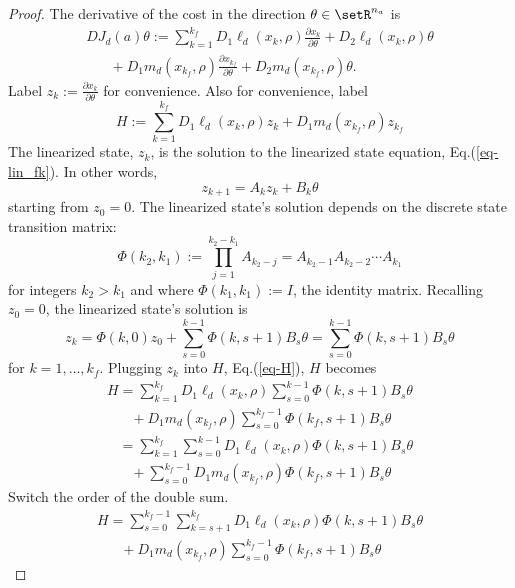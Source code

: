 \documentclass[letterpaper, 10pt, conference]{ieeeconf}
\begin{document}
\begin{proof}
The derivative of the cost in the direction $\theta\in\setR^{n_a}$ is
\begin{equation}
\begin{array}{l}
DJ_d(a)\theta:=\sum_{k=1}^{k_f}D_1\ell_d(x_k,\rho)\frac{\partial x_k}{\partial \theta} + D_2\ell_d(x_k,\rho)\theta \\\hspace{20pt}+ D_1m_d(x_{k_f},\rho)\frac{\partial x_{k_f}}{\partial \theta} + D_2m_d(x_{k_f},\rho)\theta.
\end{array}
\label{eq-DJ_dot_theta}
\end{equation}
Label $z_k:=\frac{\partial x_{k}}{\partial \theta}$ for convenience. Also for convenience, label 
\begin{equation}
H:=\sum_{k=1}^{k_f}D_1\ell_d(x_k,\rho) z_k + D_1m_d(x_{k_f},\rho) z_{k_f}
\label{eq-H}
\end{equation}
The linearized state, $z_k$, is the solution to the linearized state equation, Eq.(\ref{eq-lin_fk}).  In other words,
\[
z_{k+1} = A_kz_k + B_k\theta
\]
starting from $z_0 = 0$.  The linearized state's solution depends on the discrete state transition matrix:
\[
\Phi(k_2,k_1):=\prod_{j = 1}^{k_2-k_1} A_{k_2-j} = A_{k_2-1}A_{k_2-2}\cdots A_{k_1}
\]
for integers $k_2>k_1$ and where $\Phi(k_1,k_1):=I$, the identity matrix.  Recalling $z_0 = 0$, the linearized state's solution is
\[
z_k = \Phi(k,0)z_0 + \sum_{s = 0}^{k-1}\Phi(k,s+1)B_s\theta = \sum_{s = 0}^{k-1}\Phi(k,s+1)B_s\theta
\]
for $k = 1,\ldots,k_f$.  Plugging $z_k$ into $H$, Eq.(\ref{eq-H}), $H$ becomes
\[
\begin{array}{l}
H = \sum_{k=1}^{k_f}D_1\ell_d(x_k,\rho) \sum_{s = 0}^{k-1}\Phi(k,s+1)B_s\theta \\\hspace{20pt}+ D_1m_d(x_{k_f},\rho) \sum_{s = 0}^{k_f-1}\Phi(k_f,s+1)B_s\theta
\\\hspace{10pt} = \sum_{k=1}^{k_f}\sum_{s = 0}^{k-1}D_1\ell_d(x_k,\rho) \Phi(k,s+1) B_s\theta \\\hspace{20pt}+  \sum_{s = 0}^{k_f-1} D_1m_d(x_{k_f},\rho)\Phi(k_f,s+1)B_s\theta
\end{array}
\]
Switch the order of the double sum.  
\[
\begin{array}{l}
H = \sum_{s=0}^{k_f-1}\sum_{k = s+1}^{k_f}D_1\ell_d(x_k,\rho) \Phi(k,s+1) B_s\theta \\\hspace{20pt}+ D_1m_d(x_{k_f},\rho) \sum_{s = 0}^{k_f-1}\Phi(k_f,s+1)B_s\theta

\end{array}\]
\end{proof}
\end{document}
